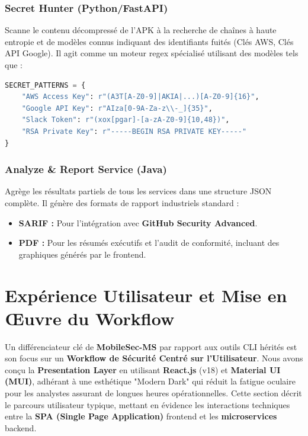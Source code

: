 \documentclass[
  journal=largetwo,
  manuscript=article-type,
  year=2025,
  volume=1,
]{cup-journal}
\begin{document}
\subsubsection{Secret Hunter (Python/FastAPI)}
Scanne le contenu décompressé de l'APK à la recherche de chaînes à haute entropie et de modèles connus indiquant des identifiants fuités (Clés AWS, Clés API Google). Il agit comme un moteur regex spécialisé utilisant des modèles tels que :
\begin{lstlisting}[language=python, caption={Modèles Regex pour la Détection de Secrets}]
SECRET_PATTERNS = {
    "AWS Access Key": r"(A3T[A-Z0-9]|AKIA|...)[A-Z0-9]{16}",
    "Google API Key": r"AIza[0-9A-Za-z\\-_]{35}",
    "Slack Token": r"(xox[pgar]-[a-zA-Z0-9]{10,48})",
    "RSA Private Key": r"-----BEGIN RSA PRIVATE KEY-----"
}
\end{lstlisting}

\subsubsection{Analyze \& Report Service (Java)}
Agrège les résultats partiels de tous les services dans une structure JSON complète. Il génère des formats de rapport industriels standard :
\begin{itemize}
    \item \textbf{SARIF :} Pour l'intégration avec \textbf{GitHub Security Advanced}.
    \item \textbf{PDF :} Pour les résumés exécutifs et l'audit de conformité, incluant des graphiques générés par le frontend.
\end{itemize}

\section{Expérience Utilisateur et Mise en Œuvre du Workflow}
\label{sec-ux}

Un différenciateur clé de \textbf{MobileSec-MS} par rapport aux outils CLI hérités est son focus sur un \textbf{Workflow de Sécurité Centré sur l'Utilisateur}. Nous avons conçu la \textbf{Presentation Layer} en utilisant \textbf{React.js} (v18) et \textbf{Material UI (MUI)}, adhérant à une esthétique "Modern Dark" qui réduit la fatigue oculaire pour les analystes assurant de longues heures opérationnelles. Cette section décrit le parcours utilisateur typique, mettant en évidence les interactions techniques entre la \textbf{SPA (Single Page Application)} frontend et les \textbf{microservices} backend.
\end{document}
